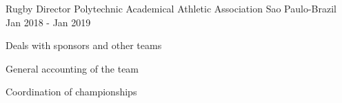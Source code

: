 


\begin{cventries}


\cventry
{Rugby Director} %
{Polytechnic Academical Athletic Association} %
{Sao Paulo-Brazil} %
{Jan 2018 - Jan 2019} %
{}
\vspace{-4mm}
{ %
\begin{cvitems}
  \item {Deals with sponsors and other teams}
  \item {General accounting of the team}
  \item {Coordination of championships}
\end{cvitems}
\vspace{5mm}
}



\end{cventries}
